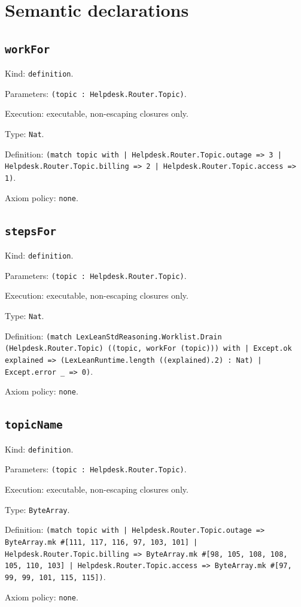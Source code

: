 \documentclass[11pt]{article}
\begin{document}
\section*{Semantic declarations}
\subsection*{\texttt{workFor}}
\noindent Kind: \texttt{definition}.\par
\noindent Parameters: \texttt{(topic : Helpdesk.Router.Topic)}.\par
\noindent Execution: executable, non-escaping closures only.\par
\noindent Type: \texttt{Nat}.\par
\noindent Definition: \texttt{(match topic with | Helpdesk.Router.Topic.outage => 3 | Helpdesk.Router.Topic.billing => 2 | Helpdesk.Router.Topic.access => 1)}.\par
\noindent Axiom policy: \texttt{none}.\par
\subsection*{\texttt{stepsFor}}
\noindent Kind: \texttt{definition}.\par
\noindent Parameters: \texttt{(topic : Helpdesk.Router.Topic)}.\par
\noindent Execution: executable, non-escaping closures only.\par
\noindent Type: \texttt{Nat}.\par
\noindent Definition: \texttt{(match LexLeanStdReasoning.Worklist.Drain (Helpdesk.Router.Topic) ((topic, workFor (topic))) with | Except.ok explained => (LexLeanRuntime.length ((explained).2) : Nat) | Except.error \_ => 0)}.\par
\noindent Axiom policy: \texttt{none}.\par
\subsection*{\texttt{topicName}}
\noindent Kind: \texttt{definition}.\par
\noindent Parameters: \texttt{(topic : Helpdesk.Router.Topic)}.\par
\noindent Execution: executable, non-escaping closures only.\par
\noindent Type: \texttt{ByteArray}.\par
\noindent Definition: \texttt{(match topic with | Helpdesk.Router.Topic.outage => ByteArray.mk \#[111, 117, 116, 97, 103, 101] | Helpdesk.Router.Topic.billing => ByteArray.mk \#[98, 105, 108, 108, 105, 110, 103] | Helpdesk.Router.Topic.access => ByteArray.mk \#[97, 99, 99, 101, 115, 115])}.\par
\noindent Axiom policy: \texttt{none}.\par
\end{document}
